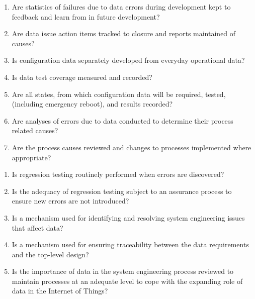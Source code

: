 \begin{enumerate}
  \item Are statistics of failures due to \glspl{data error} during development kept to feedback and learn from in future development?
  \item Are data issue action items tracked to closure and reports maintained of causes?
  \item Is \gls{configuration data} separately developed from everyday operational data?
  \item Is data test coverage measured and recorded?
  \item Are all states, from which \gls{configuration data} will be required, tested, (including emergency reboot), and results recorded?
  \item Are analyses of errors due to data conducted to determine their process related causes?
  \item Are the process causes reviewed and changes to processes implemented where appropriate?
\end{enumerate}

\begin{enumerate}
  \item Is regression testing routinely performed when errors are discovered?
  \item Is the adequacy of regression testing subject to an assurance process to ensure new errors are not introduced?
  \item Is a mechanism used for identifying and resolving system engineering issues that affect data?
  \item Is a mechanism used for ensuring traceability between the data requirements and the top-level design?
  \item Is the importance of data in the system engineering process reviewed to maintain processes at an adequate level to cope with the expanding role of data in the Internet of Things? 
\end{enumerate}
